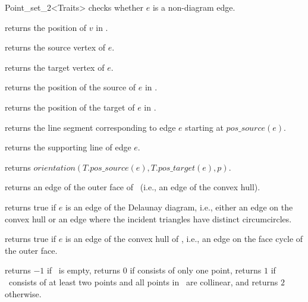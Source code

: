 \begin{ccRefClass}{Point_set_2<Traits>}
{ checks whether $e$ is a non-diagram edge. }

{ returns the position of $v$ in \ccVar.}

{ returns the source vertex of $e$.}

{ returns the target vertex of $e$.}
    
{ returns the position of the source of $e$ in \ccVar.}
   
{ returns the position of the target of $e$ in \ccVar.}
    
{ returns the line segment corresponding to edge $e$ starting
at $pos\_source(e)$.}
   
{ returns the supporting line of edge $e$.}

{ returns $orientation(T.pos\_source(e),T.pos\_target(e),p)$.}
   
{ returns an edge of the outer face  of \ccVar\ (i.e., an edge of the convex hull). }
    
{returns true if $e$ is an edge of the Delaunay diagram, i.e., either
an edge on the convex hull or an edge where the incident triangles have 
distinct circumcircles.}
    
{returns true if $e$ is an edge of the convex hull of \ccVar, i.e.,
an edge on the face cycle of the outer face. }

\ccHtmlLinksOn

{returns $-1$ if \ccVar\ is empty, returns $0$ if \ccVar
consists of only one point,     
returns $1$ if \ccVar\ consists of at least two points 
and all points in \ccVar\
are collinear, and returns $2$ otherwise.}

\end{ccRefClass} 
